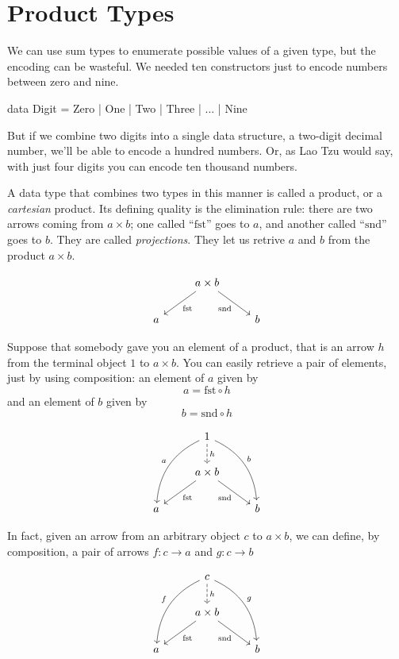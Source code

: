 \documentclass[DaoFP]{subfiles}
\begin{document}
\setcounter{chapter}{4}

\chapter{Product Types}

We can use sum types to enumerate possible values of a given type, but the encoding can be wasteful. We needed ten constructors just to encode numbers between zero and nine.
\begin{haskell}
data Digit = Zero | One | Two | Three | ... | Nine
\end{haskell}
But if we combine two digits into a single data structure, a two-digit decimal number, we'll be able to encode a hundred numbers. Or, as Lao Tzu would say, with just four digits you can encode ten thousand numbers.

A data type that combines two types in this manner is called a product, or a \emph{cartesian} product. Its defining quality is the elimination rule: there are two arrows coming from $a \times b$; one called ``$\text{fst}$'' goes to $a$, and another called ``$\text{snd}$'' goes to $b$. They are called \emph{projections}. They let us retrive $a$ and $b$ from the product $a \times b$.

\[
 \begin{tikzcd}
& a \times b
 \arrow[dl,  "\text{fst}"]
 \arrow[dr,   "\text{snd}"']
\\
a && b
 \end{tikzcd}
\]

Suppose that somebody gave you an element of a product, that is an arrow $h$ from the terminal object $1$ to $a \times b$. You can easily retrieve a pair of elements, just by using composition: an element of $a$ given by 
\[a = \text{fst} \circ h \]
and an element of $b$ given by
\[b = \text{snd} \circ h \]

\[
 \begin{tikzcd}
 & 1
\arrow[d, dashed, "h"]
 \arrow[ddl, bend right, "a"']
 \arrow[ddr, bend left, "b"]
\\
&a \times b
 \arrow[dl,  "\text{fst}"]
 \arrow[dr,   "\text{snd}"']
\\
a && b
 \end{tikzcd}
\]

In fact, given an arrow from an arbitrary object $c$ to $a \times b$, we can define, by composition, a pair of arrows $f \colon c \to a$ and $g \colon c \to b$

\[
 \begin{tikzcd}
 & c
\arrow[d, dashed, "h"]
 \arrow[ddl, bend right, "f"']
 \arrow[ddr, bend left, "g"]
\\
&a \times b
 \arrow[dl,  "\text{fst}"]
  \arrow[dr,   "\text{snd}"']
\\
a && b
 \end{tikzcd}
\]
\end{document}
